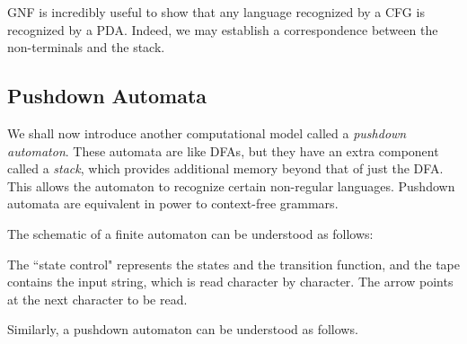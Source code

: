 GNF is incredibly useful to show that any language recognized by a CFG is recognized by a PDA. Indeed, we may establish a correspondence between the non-terminals and the stack.

\clearpage

\subsection{Pushdown Automata}
We shall now introduce another computational model called a \textit{pushdown automaton}. These automata are like DFAs, but they have an extra component called a \textit{stack}, which provides additional memory beyond that of just the DFA. This allows the automaton to recognize certain non-regular languages. Pushdown automata are equivalent in power to context-free grammars. 

The schematic of a finite automaton can be understood as follows:
\begin{center}
\end{center}

The ``state control" represents the states and the transition function, and the tape contains the input string, which is read character by character. The arrow points at the next character to be read.

\vspace{3mm}
Similarly, a pushdown automaton can be understood as follows.

